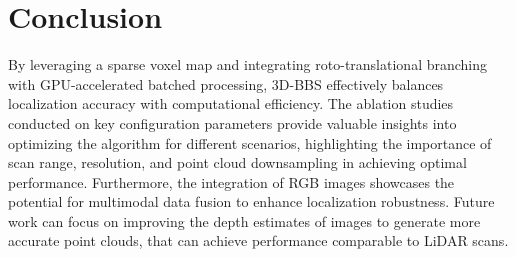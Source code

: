 \section{Conclusion}
\label{sec:conclusion}

By leveraging a sparse voxel map and integrating roto-translational branching with GPU-accelerated batched processing, 3D-BBS effectively balances localization accuracy with computational efficiency. The ablation studies conducted on key configuration parameters provide valuable insights into optimizing the algorithm for different scenarios, highlighting the importance of scan range, resolution, and point cloud downsampling in achieving optimal performance. Furthermore, the integration of RGB images showcases the potential for multimodal data fusion to enhance localization robustness. Future work can focus on improving the depth estimates of images to generate more accurate point clouds, that can achieve performance comparable to LiDAR scans.
